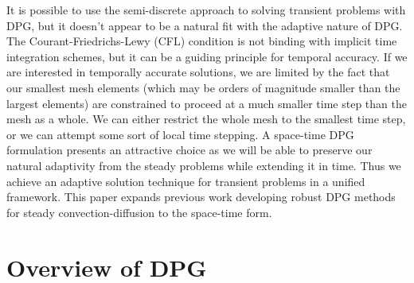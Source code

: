 \documentclass{article}
\theoremstyle{definition}
\theoremstyle{remark}
\begin{document}
It is possible to use the semi-discrete approach to solving transient problems with DPG, 
but it doesn't appear to be a natural fit with the adaptive nature of DPG.
The Courant-Friedrichs-Lewy (CFL) condition is not binding with implicit time integration schemes, but it can be a guiding principle for temporal accuracy.
If we are interested in temporally accurate solutions, we are limited by the fact that our smallest mesh elements 
(which may be orders of magnitude smaller than the largest elements) are constrained to proceed at a much smaller time step than the mesh as a whole. 
We can either restrict the whole mesh to the smallest time step, or we can attempt some sort of local time stepping.
A space-time DPG formulation presents an attractive choice as we will be able to preserve our natural adaptivity 
from the steady problems while extending it in time.
Thus we achieve an adaptive solution technique for transient problems in a unified framework.
This paper expands previous work developing robust DPG methods for steady convection-diffusion to the space-time form.


\section{Overview of DPG}
\end{document}
